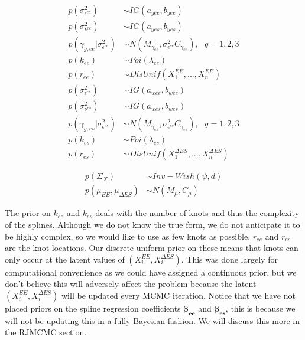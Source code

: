 \documentclass[11pt]{article}\usepackage[]{graphicx}\usepackage[]{color}
\begin{document}
\begin{multicols}{2}
\noindent 
  \begin{align}
  p(\sigma^2_{\epsilon^{ee}}) &\sim IG(a_{yee},b_{yee}) \\
  p(\sigma^2_{\nu^{ee}}) &\sim IG(a_{yes},b_{yes}) \\
  p(\gamma_{g,ee}|\sigma^2_{\epsilon^{ee}}) &\sim N(M_{\gamma_{ee}},\sigma^2_{\epsilon^{ee}} C_{\gamma_{ee}})  , \text{ } g=1,2,3 \\
  p(k_{ee}) &\sim Poi(\lambda_{ee}) \\
  p(r_{ee}) &\sim DisUnif(X_1^{EE},...,X_n^{EE})
  \end{align}
\columnbreak
  \begin{align}
  p(\sigma^2_{\epsilon^{es}}) &\sim IG(a_{wee},b_{wee}) \\
  p(\sigma^2_{\nu^{es}}) &\sim IG(a_{wes},b_{wes}) \\
  p(\gamma_{g,es}|\sigma^2_{\epsilon^{es}}) &\sim N(M_{\gamma_{es}},\sigma^2_{\epsilon^{es}} C_{\gamma_{es}}) , \text{ } g=1,2,3 \\
  p(k_{es}) &\sim Poi(\lambda_{es}) \\
  p(r_{es}) &\sim DisUnif(X_1^{\Delta ES},...,X_n^{\Delta ES})
  \end{align}
\end{multicols}



\begin{align}
   p(\Sigma_{X}) &\sim Inv-Wish(\psi,d) \\
   p(\mu_{EE},\mu_{\Delta ES}) &\sim N(M_{\mu},C_{\mu})
\end{align}



The prior on $k_{ee}$ and $k_{es}$ deals with the number of knots and thus the complexity of the splines. Although we do not know the true form, we do not anticipate it to be highly complex, so we would like to use as few knots as possible. $r_{ee}$ and $r_{es}$ are the knot locations. Our discrete uniform prior on these means that knots can only occur at the latent values of $(X_i^{EE},X_i^{\Delta ES})$. This was done largely for computational convenience as we could have assigned a continuous prior, but we don't believe this will adversely affect the problem because the latent $(X_i^{EE},X_i^{\Delta ES})$ will be updated every MCMC iteration. Notice that we have not placed priors on the spline regression coefficients $\boldsymbol{\beta_{ee}}$ and $\boldsymbol{\beta_{es}}$, this is because we will not be updating this in a fully Bayesian fashion. We will discuss this more in the RJMCMC section.
\end{document}

